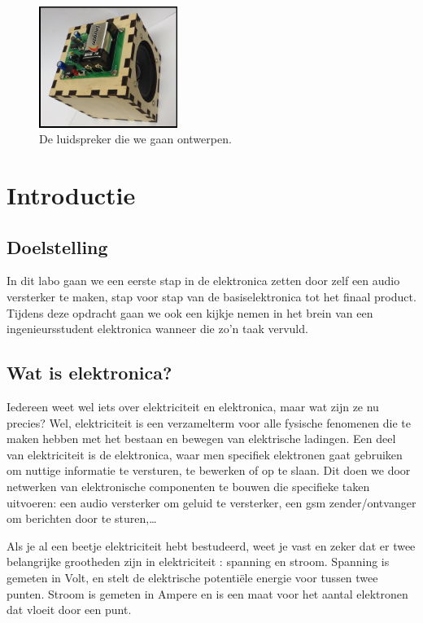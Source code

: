 \documentclass[11pt]{article}
\begin{document}
\maketitle
\begin{figure}[htbp]
	\centering
	\includegraphics[width=0.4\textwidth]{foto}
	\caption{De luidspreker die we gaan ontwerpen.}
	\label{fig:foto}
\end{figure}
\section{Introductie}
\subsection{Doelstelling}
In dit labo gaan we een eerste stap in de elektronica zetten door zelf een audio versterker te maken, stap voor stap van de basiselektronica tot het finaal product. Tijdens deze opdracht gaan we ook een kijkje nemen in het brein van een ingenieursstudent elektronica wanneer die zo'n taak vervuld. 

\subsection{Wat is elektronica?}
Iedereen weet wel iets over elektriciteit en elektronica, maar wat zijn ze nu precies? Wel, elektriciteit is een verzamelterm voor alle fysische fenomenen die te maken hebben met het bestaan en bewegen van elektrische ladingen. Een deel van elektriciteit is de elektronica, waar men specifiek elektronen gaat gebruiken om nuttige informatie te versturen, te bewerken of op te slaan. Dit doen we door netwerken van elektronische componenten te bouwen die specifieke taken uitvoeren: een audio versterker om geluid te versterker, een gsm zender/ontvanger om berichten door te sturen,\ldots

Als je al een beetje elektriciteit hebt bestudeerd, weet je vast en zeker dat er twee belangrijke grootheden zijn in elektriciteit : spanning en stroom. Spanning is gemeten in Volt, en stelt de elektrische potentiële energie voor tussen twee punten. Stroom is gemeten in Ampere en is een maat voor het aantal elektronen dat vloeit door een punt.
\end{document}
